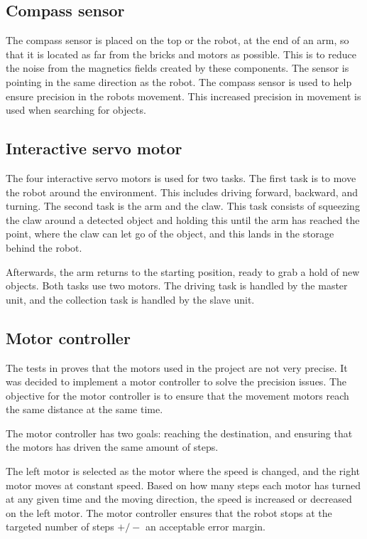 \subsection{Compass sensor}
The compass sensor is placed on the top or the robot, at the end of an arm, so that it is located as far from the bricks and motors as possible. This is to reduce the noise from the magnetics fields created by these components. The sensor is pointing in the same direction as the robot. The compass sensor is used to help ensure precision in the robots movement. This increased precision in movement is used when searching for objects.

\subsection{Interactive servo motor}
The four interactive servo motors is used for two tasks. The first task is to move the robot around the environment. This includes driving forward, backward, and turning. The second task is the arm and the claw. This task consists of squeezing the claw around a detected object and holding this until the arm has reached the point, where the claw can let go of the object, and this lands in the storage behind the robot.

Afterwards, the arm returns to the starting position, ready to grab a hold of new objects. Both tasks use two motors. The driving task is handled by the master unit, and the collection task is handled by the slave unit.

\subsection{Motor controller}\label{sec:design-motor-controller}
The tests in  proves that the motors used in the project are not very precise. It was decided to implement a motor controller to solve the precision issues. The objective for the motor controller is to ensure that the movement motors reach the same distance at the same time. 

The motor controller has two goals: reaching the destination, and ensuring that the motors has driven the same amount of steps. 

The left motor is selected as the motor where the speed is changed, and the right motor moves at constant speed. Based on how many steps each motor has turned at any given time and the moving direction, the speed is increased or decreased on the left motor. The motor controller ensures that the robot stops at the targeted number of steps $+/-$ an acceptable error margin.

